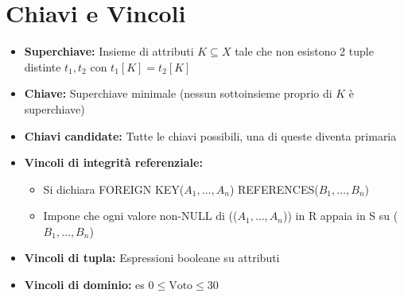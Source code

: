 \section{Chiavi e Vincoli}
\begin{itemize}
    \item \textbf{Superchiave:} Insieme di attributi $K \subseteq X$ tale che non esistono 2 tuple distinte $t_1,t_2$ con $t_1[K]=t_2[K]$
    \item \textbf{Chiave:} Superchiave minimale (nessun sottoinsieme proprio di $K$ è superchiave)
    \item \textbf{Chiavi candidate:} Tutte le chiavi possibili, una di queste diventa primaria
    \item \textbf{Vincoli di integrità referenziale:}
    \begin{itemize}
        \item Si dichiara FOREIGN KEY($A_1,\dots,A_n$) REFERENCES($B_1,\dots,B_n$)
        \item Impone che ogni valore non-NULL di (($A_1,\dots,A_n$)) in R appaia in S su ($B_1,\dots,B_n$)
    \end{itemize}
    \item \textbf{Vincoli di tupla:} Espressioni booleane su attributi
    \item \textbf{Vincoli di dominio:} es $0 \leq \text{Voto} \leq 30$
\end{itemize}

